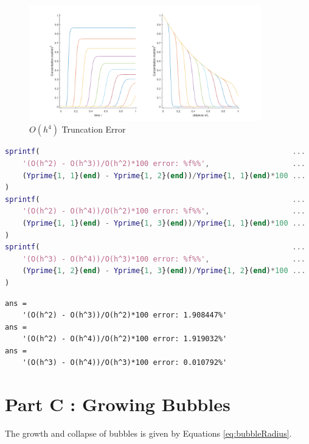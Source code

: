 \documentclass{article}
\begin{document}
\begin{figure}[h!]
	\centering
	\includegraphics[width=0.90\textwidth]{./matlab/Oh4_truncationError.png}
	\caption{$O(h^4)$ Truncation Error}
	\label{img:Oh4TruncationError}
\end{figure}

\begin{lstlisting}[language=Matlab, caption=Reactor : Compute percent error for each implementation, label=lis:reactorComputePercentError]
%% Print error between O(h)s
sprintf(                                                          ...
    '(O(h^2) - O(h^3))/O(h^2)*100 error: %f%%',                   ...
    (Yprime{1, 1}(end) - Yprime{1, 2}(end))/Yprime{1, 1}(end)*100 ...
)
sprintf(                                                          ...
    '(O(h^2) - O(h^4))/O(h^2)*100 error: %f%%',                   ...
    (Yprime{1, 1}(end) - Yprime{1, 3}(end))/Yprime{1, 1}(end)*100 ...
)
sprintf(                                                          ...
    '(O(h^3) - O(h^4))/O(h^3)*100 error: %f%%',                   ...
    (Yprime{1, 2}(end) - Yprime{1, 3}(end))/Yprime{1, 2}(end)*100 ...
)
\end{lstlisting}

\begin{lstlisting}[caption=Reactor : Percent errors for each truncation, label=lis:reactorPercentErrorsForEachTruncation]
ans =
    '(O(h^2) - O(h^3))/O(h^2)*100 error: 1.908447%'
ans =
    '(O(h^2) - O(h^4))/O(h^2)*100 error: 1.919032%'
ans =
    '(O(h^3) - O(h^4))/O(h^3)*100 error: 0.010792%'
\end{lstlisting}


\section{Part C : Growing Bubbles}

The growth and collapse of bubbles is given by Equations \ref{eq:bubbleRadius}.
\end{document}
